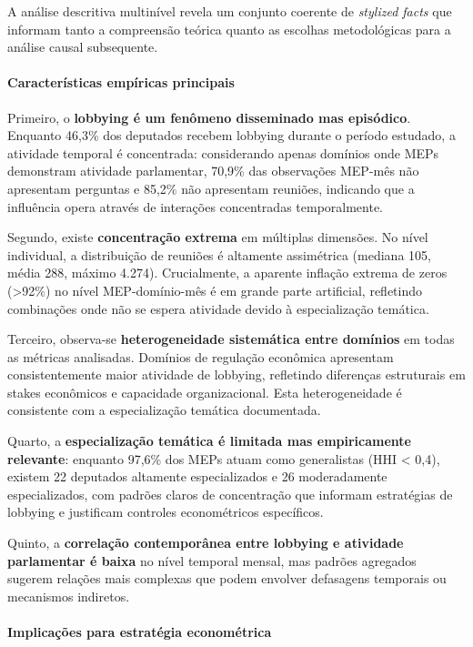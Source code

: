 A análise descritiva multinível revela um conjunto coerente de \textit{stylized facts} que informam tanto a compreensão teórica quanto as escolhas metodológicas para a análise causal subsequente.

\paragraph{Características empíricas principais}

Primeiro, o \textbf{lobbying é um fenômeno disseminado mas episódico}. Enquanto 46,3\% dos deputados recebem lobbying durante o período estudado, a atividade temporal é concentrada: considerando apenas domínios onde MEPs demonstram atividade parlamentar, 70,9\% das observações MEP-mês não apresentam perguntas e 85,2\% não apresentam reuniões, indicando que a influência opera através de interações concentradas temporalmente.

Segundo, existe \textbf{concentração extrema} em múltiplas dimensões. No nível individual, a distribuição de reuniões é altamente assimétrica (mediana 105, média 288, máximo 4.274). Crucialmente, a aparente inflação extrema de zeros (>92\%) no nível MEP-domínio-mês é em grande parte artificial, refletindo combinações onde não se espera atividade devido à especialização temática.

Terceiro, observa-se \textbf{heterogeneidade sistemática entre domínios} em todas as métricas analisadas. Domínios de regulação econômica apresentam consistentemente maior atividade de lobbying, refletindo diferenças estruturais em stakes econômicos e capacidade organizacional. Esta heterogeneidade é consistente com a especialização temática documentada.

Quarto, a \textbf{especialização temática é limitada mas empiricamente relevante}: enquanto 97,6\% dos MEPs atuam como generalistas (HHI < 0,4), existem 22 deputados altamente especializados e 26 moderadamente especializados, com padrões claros de concentração que informam estratégias de lobbying e justificam controles econométricos específicos.

Quinto, a \textbf{correlação contemporânea entre lobbying e atividade parlamentar é baixa} no nível temporal mensal, mas padrões agregados sugerem relações mais complexas que podem envolver defasagens temporais ou mecanismos indiretos.

\paragraph{Implicações para estratégia econométrica}

